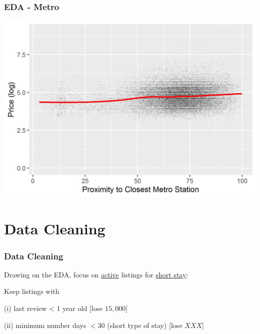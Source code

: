 \documentclass{beamer}
\begin{document}
\begin{frame}
    \frametitle{EDA - Metro}
    \includegraphics[scale = 0.8]{log_price_vs_prox_metro.jpeg}
\end{frame}

\section{Data Cleaning}


\begin{frame}
    \frametitle{Data Cleaning}
    Drawing on the EDA, focus on \underline{active} listings for \underline{short stay}:
    
    Keep listings with
    
    (i) last review < 1 year old [lose $15,000$]
    
    (ii) minimum number days $< 30$ (short type of stay) [lose $XXX$]
    
\end{frame}
\end{document}
